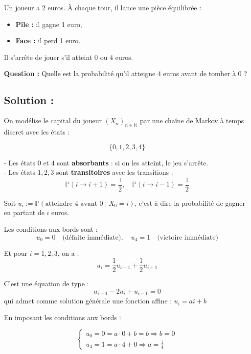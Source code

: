 \begin{exerciseBox}
Un joueur a 2 euros. À chaque tour, il lance une pièce équilibrée :

\begin{itemize}
    \item \textbf{Pile :} il gagne 1 euro,
    \item \textbf{Face :} il perd 1 euro.
\end{itemize}

Il s'arrête de jouer s'il atteint 0 ou 4 euros.

\textbf{Question :}  
Quelle est la probabilité qu’il atteigne 4 euros avant de tomber à 0 ?
\end{exerciseBox}


\subsection*{Solution :}
On modélise le capital du joueur $(X_n)_{n \in \mathbb{N}}$ par une chaîne de Markov à temps discret avec les états :

\[
\{0, 1, 2, 3, 4\}
\]

- Les états \( 0 \) et \( 4 \) sont \textbf{absorbants} : si on les atteint, le jeu s’arrête. \\
- Les états \( 1, 2, 3 \) sont \textbf{transitoires} avec les transitions :
  \[
  \mathbb{P}(i \to i+1) = \frac{1}{2}, \quad \mathbb{P}(i \to i-1) = \frac{1}{2}
  \]

Soit \( u_i := \mathbb{P}(\text{atteindre } 4 \text{ avant } 0 \mid X_0 = i) \), c’est-à-dire la probabilité de gagner en partant de \( i \) euros.

Les conditions aux bords sont :
\[
u_0 = 0 \quad \text{(défaite immédiate)}, \quad u_4 = 1 \quad \text{(victoire immédiate)}
\]

Et pour \( i = 1, 2, 3 \), on a :
\[
u_i = \frac{1}{2} u_{i-1} + \frac{1}{2} u_{i+1}
\]

C’est une équation de type :
\[
u_{i+1} - 2u_i + u_{i-1} = 0
\]
qui admet comme solution générale une fonction affine : \( u_i = a i + b \)

En imposant les conditions aux bords :

\[
\begin{cases}
u_0 = 0 = a \cdot 0 + b = b \Rightarrow b = 0 \\
u_4 = 1 = a \cdot 4 + 0 \Rightarrow a = \frac{1}{4}
\end{cases}
\]

